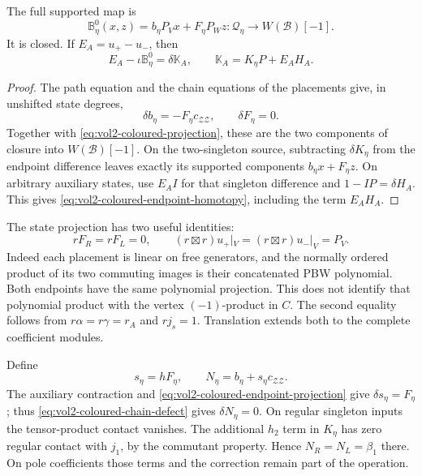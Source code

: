 \begin{lemma}\label{lem:vol2-coloured-lift}
The full supported map is
\[
 \mathbb B^0_\eta(x,z)=b_\eta P_Vx+F_\eta P_Wz:
       \mathcal Q_\eta\longrightarrow W(\mathcal B)[-1].
\]
It is closed. If $E_A=u_+-u_-$, then
\begin{equation}\label{eq:vol2-coloured-endpoint-homotopy}
 E_A-\iota\mathbb B^0_\eta=\delta\mathbb K_A,
 \qquad \mathbb K_A=K_\eta P+E_AH_A.
\end{equation}
\end{lemma}

\begin{proof}
The path equation and the chain equations of the placements
give, in unshifted state degrees,
\begin{equation}\label{eq:vol2-coloured-chain-defect}
 \delta b_\eta=-F_\eta c_{\mathcal Z\mathcal Z},
 \qquad \delta F_\eta=0.
\end{equation}
Together with \eqref{eq:vol2-coloured-projection}, these are
the two components of closure into $W(\mathcal B)[-1]$.
On the two-singleton source, subtracting $\delta K_\eta$
from the endpoint difference leaves exactly its supported
components $b_\eta x+F_\eta z$. On arbitrary auxiliary
states, use $E_AI$ for that singleton difference and
$1-IP=\delta H_A$. This gives
\eqref{eq:vol2-coloured-endpoint-homotopy}, including the
term $E_AH_A$.
\end{proof}

The state projection has two useful identities:
\begin{equation}\label{eq:vol2-coloured-endpoint-projection}
 rF_R=rF_L=0,
 \qquad (r\boxtimes r)u_+|_V=(r\boxtimes r)u_-|_V=P_V.
\end{equation}
Indeed each placement is linear on free generators, and the
normally ordered product of its two commuting images is their
concatenated PBW polynomial. Both endpoints have the same
polynomial projection. This does not identify that polynomial
product with the vertex $(-1)$-product in $C$.
The second equality follows from $r\alpha=r\gamma=r_A$
and $rj_s=1$. Translation extends both to the complete
coefficient modules.

Define
\begin{equation}\label{eq:vol2-corrected-punctured-operation}
 s_\eta=hF_\eta,\qquad
 N_\eta=b_\eta+s_\eta c_{\mathcal Z\mathcal Z}.
\end{equation}
The auxiliary contraction and
\eqref{eq:vol2-coloured-endpoint-projection} give
$\delta s_\eta=F_\eta$; thus
\eqref{eq:vol2-coloured-chain-defect} gives $\delta N_\eta=0$.
On regular singleton inputs the tensor-product contact
vanishes. The additional $h_2$ term in $K_\eta$ has zero
regular contact with $j_1$, by the commutant property. Hence
$N_R=N_L=\beta_1$ there. On pole coefficients those terms
and the correction remain part of the operation.

